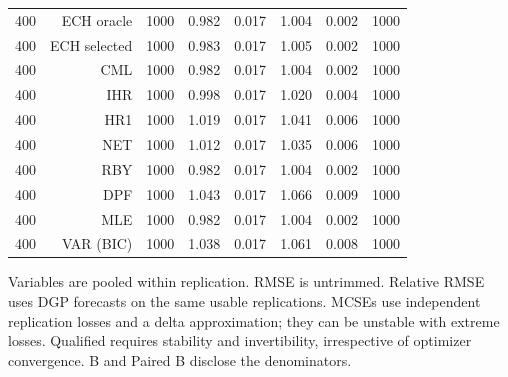 \begin{table}[p]
\begin{tabular}{rrrrrrrr}
400 & ECH oracle & 1000 & 0.982 & 0.017 & 1.004 & 0.002 & 1000 \\
400 & ECH selected & 1000 & 0.983 & 0.017 & 1.005 & 0.002 & 1000 \\
400 & CML & 1000 & 0.982 & 0.017 & 1.004 & 0.002 & 1000 \\
400 & IHR & 1000 & 0.998 & 0.017 & 1.020 & 0.004 & 1000 \\
400 & HR1 & 1000 & 1.019 & 0.017 & 1.041 & 0.006 & 1000 \\
400 & NET & 1000 & 1.012 & 0.017 & 1.035 & 0.006 & 1000 \\
400 & RBY & 1000 & 0.982 & 0.017 & 1.004 & 0.002 & 1000 \\
400 & DPF & 1000 & 1.043 & 0.017 & 1.066 & 0.009 & 1000 \\
400 & MLE & 1000 & 0.982 & 0.017 & 1.004 & 0.002 & 1000 \\
400 & VAR (BIC) & 1000 & 1.038 & 0.017 & 1.061 & 0.008 & 1000 \\
\bottomrule\end{tabular}
\par\medskip
\begin{minipage}{0.98\linewidth}\footnotesize Variables are pooled within replication. RMSE is untrimmed. Relative RMSE uses DGP forecasts on the same usable replications. MCSEs use independent replication losses and a delta approximation; they can be unstable with extreme losses. Qualified requires stability and invertibility, irrespective of optimizer convergence. B and Paired B disclose the denominators.\end{minipage}
\end{table}
